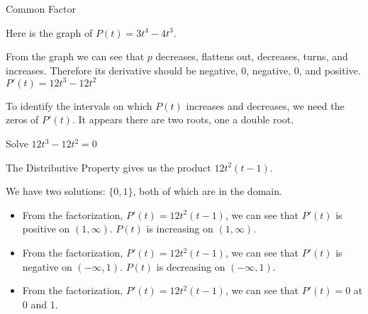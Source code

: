 \documentclass{ximera}
\begin{document}
\begin{example}  Common Factor


Here is the graph of $P(t) = 3 t^4 - 4 t^3$.



\begin{center}
\end{center}


From the graph we can see that $p$ decreases, flattens out, decreases, turns, and increases.  Therefore its derivative should be negative, $0$, negative, $0$, and positive. \\



$P'(t) = 12 t^3 - 12 t^2$ \\




\begin{center}
\end{center}



To identify the intervals on which $P(t)$ increases and decreases, we need the zeros of $P'(t)$.  It appears there are two roots, one a double root.






Solve $12 t^3 - 12 t^2 = 0$


\begin{explanation}

The Distributive Property gives us the product $12 t^2 (t-1)$.




We have two solutions: $\{ 0, 1  \}$, both of which are in the domain.




\begin{itemize}
\item From the factorization, $P'(t) = 12 t^2 (t-1)$, we can see that $P'(t)$ is positive on $(1, \infty)$. $P(t)$ is increasing on $(1, \infty)$. \\
\item From the factorization, $P'(t) = 12 t^2 (t-1)$, we can see that $P'(t)$ is negative on $(-\infty, 1)$. $P(t)$ is decreasing on $(-\infty, 1)$. \\
\item From the factorization, $P'(t) = 12 t^2 (t-1)$, we can see that $P'(t) = 0$ at $0$ and $1$. \\
\end{itemize}


\end{explanation}
\end{example}
\end{document}
